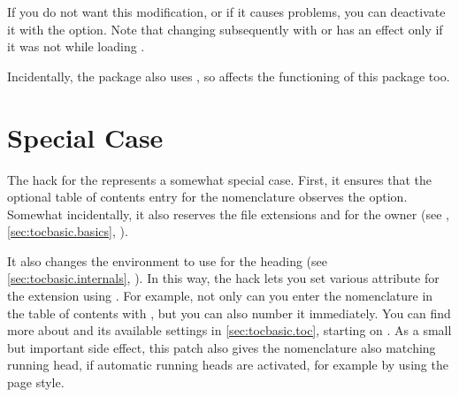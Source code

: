 If you do not want this modification, or if it causes problems, you can
deactivate it with the
option. Note that changing  subsequently
with  or
 has an effect only
if it was not  while loading .

Incidentally, the 
package also uses , so  affects the
functioning of this package too.%


\section{Special Case }
\label{sec:nomencl}

The hack for the
 represents a somewhat
special case. First, it ensures that the optional table of contents entry for
the nomenclature observes the 
option. Somewhat incidentally, it also reserves the file extensions 
and  for the owner  (see
, \autoref{sec:tocbasic.basics},
).

It also changes the 
environment to use
 for the
heading (see \autoref{sec:tocbasic.internals},
). In this way, the hack lets you
set various attribute for the  extension using
%
. For example, not only can you
enter the nomenclature in the table of contents with
, but you
can also number it immediately. You can find more about
 and its available settings in
\autoref{sec:tocbasic.toc}, starting on . 
As a small but important side effect, this patch also gives the nomenclature
also matching running head, if automatic running heads are activated, for
example by using the  page style.

